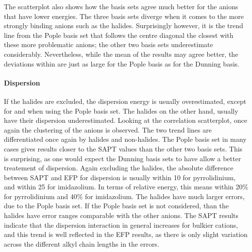 The scatterplot also shows how the basis sets agree much better for the anions that have lower energies.
The three basis sets diverge when it comes to the more strongly binding anions such as the halides.
Surprisingly however, it is the trend line from the Pople basis set that follows the centre diagonal the closest with these more problematic anions; the other two basis sets underestimate considerably.
Nevertheless, while the mean of the results may agree better, the deviations within are just as large for the Pople basis as for the Dunning basis.


\paragraph{Dispersion}
If the halides are excluded, the dispersion energy is usually overestimated, except for \bfl and \pf when using the Pople basis set. 
The halides on the other hand, usually have their dispersion underestimated.
Looking at the correlation scatterplot, once again the clustering of the anions is observed.
The two trend lines are differentiated once again by halides and non-halides. 
The Pople basis set in many cases gives results closer to the SAPT values than the other two basis sets.
This is surprising, as one would expect the Dunning basis sets to have allow a better treatement of dispersion.
Again excluding the halides, the absolute difference between SAPT and EFP for dispersion is usually within 10 \enUnit for pyrrolidinium, and within 25 \enUnit for imidazolium.
In terms of relative energy, this means within 20\% for pyrrolidinium and 40\% for imidazolium.
The halides have much larger errors, due to the Pople basis set. 
If the Pople basis set is not considered, than the halides have error ranges comparable with the other anions.
The SAPT results indicate that the dispersion interaction in general increases for bulkier cations, and this trend is well reflected in the EFP results, as there is only slight variation across the different alkyl chain lengths in the errors. 


